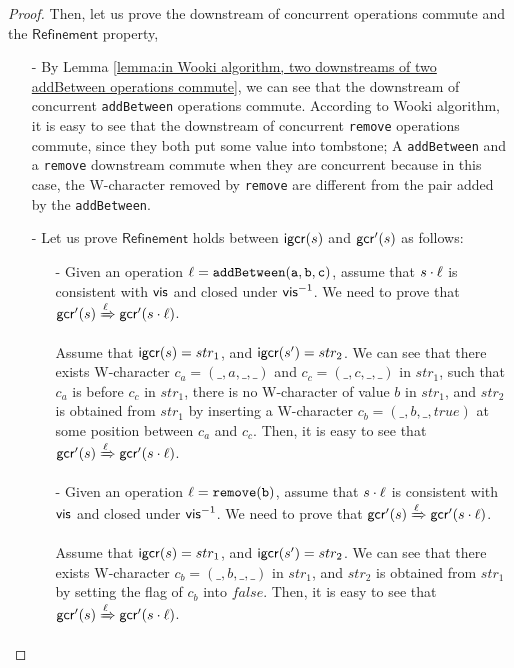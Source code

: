 {\begin {proof}
Then, let us prove the downstream of concurrent operations commute and the $\mathsf{Refinement}$ property,

\begin{itemize}
\setlength{\itemsep}{0.5pt}
\item[-] By Lemma \ref{lemma:in Wooki algorithm, two downstreams of two addBetween operations commute}, we can see that the downstream of concurrent {\tt addBetween} operations commute. According to Wooki algorithm, it is easy to see that the downstream of concurrent {\tt remove} operations commute, since they both put some value into tombstone; A {\tt addBetween} and a {\tt remove} downstream commute when they are concurrent because in this case, the W-character removed by {\tt remove} are different from the pair added by the {\tt addBetween}.
\item[-] Let us prove $\mathsf{Refinement}$ holds between $\mathsf{igcr}(s)$ and $\mathsf{gcr}'(s)$ as follows:

    \begin{itemize}
    \setlength{\itemsep}{0.5pt}
    \item[-] Given an operation $\alabel = \alabelshort[{\tt addBetween}]{a,b,c}$, assume that $s \cdot \ell$ is consistent with $\mathsf{vis}$ and closed under $\mathsf{vis}^{-1}$. We need to prove that $\mathsf{gcr}'(s)\xRightarrow{\ensuremath{\ell}}\mathsf{gcr}'(s \cdot \ell)$.

        Assume that $\mathsf{igcr}(s)=str_1$, and $\mathsf{igcr}(s')=str_2$. We can see that there exists W-character $c_a = (\_,a,\_,\_)$ and $c_c = (\_,c,\_,\_)$ in $str_1$, such that $c_a$ is before $c_c$ in $str_1$, there is no W-character of value $b$ in $str_1$, and $str_2$ is obtained from $str_1$ by inserting a W-character $c_b = (\_,b,\_,\mathit{true})$ at some position between $c_a$ and $c_c$. Then, it is easy to see that $\mathsf{gcr}'(s)\xRightarrow{\ensuremath{\ell}}\mathsf{gcr}'(s \cdot \ell)$.

    \item[-] Given an operation $\alabel = \alabelshort[{\tt remove}]{b}$, assume that $s \cdot \ell$ is consistent with $\mathsf{vis}$ and closed under $\mathsf{vis}^{-1}$. We need to prove that $\mathsf{gcr}'(s)\xRightarrow{\ensuremath{\ell}}\mathsf{gcr}'(s \cdot \ell)$.

        Assume that $\mathsf{igcr}(s)=str_1$, and $\mathsf{igcr}(s')=str_2$. We can see that there exists W-character $c_b = (\_,b,\_,\_)$ in $str_1$, and $str_2$ is obtained from $str_1$ by setting the flag of $c_b$ into $\mathit{false}$. Then, it is easy to see that $\mathsf{gcr}'(s)\xRightarrow{\ensuremath{\ell}}\mathsf{gcr}'(s \cdot \ell)$.


\end{itemize}
\end{itemize}
\end{proof}}
